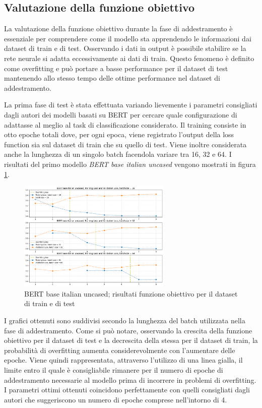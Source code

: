 \subsection{Valutazione della funzione obiettivo}
    La valutazione della funzione obiettivo durante la fase di addestramento è essenziale per comprendere come il modello sta apprendendo le informazioni dai dataset di train e di test. Osservando i dati in output è possibile stabilire se la rete neurale si adatta eccessivamente ai dati di train. Questo fenomeno è definito come overfitting e può portare a basse performance per il dataset di test mantenendo allo stesso tempo delle ottime performance nel dataset di addestramento.
    
    La prima fase di test è stata effettuata variando lievemente i parametri consigliati dagli autori dei modelli basati su BERT per cercare quale configurazione di adattasse al meglio al task di classificazione considerato. Il training consiste in otto epoche totali dove, per ogni epoca, viene registrato l'output della loss function sia sul dataset di train che su quello di test. Viene inoltre considerata anche la lunghezza di un singolo batch facendola variare tra 16, 32 e 64. I risultati del primo modello \textit{BERT base italian uncased} vengono mostrati in figura \ref{fig:losses-uncased}.
    
    \begin{figure}[h]
        \centering
        \includegraphics[width=0.65\textwidth]{pics/bert base italian uncased/losses.png}
        \caption{BERT base italian uncased; risultati funzione obiettivo per il dataset di train e di test}
        \label{fig:losses-uncased}
    \end{figure}
    
    
    I grafici ottenuti sono suddivisi secondo la lunghezza del batch utilizzata nella fase di addestramento. Come si può notare, osservando la crescita della funzione obiettivo per il dataset di test e la decrescita della stessa per il dataset di train, la probabilità di overfitting aumenta considerevolmente con l'aumentare delle epoche. Viene quindi rappresentata, attraverso l'utilizzo di una linea gialla, il limite entro il quale è consigliabile rimanere per il numero di epoche di addestramento necessarie al modello prima di incorrere in problemi di overfitting. I parametri ottimi ottenuti coincidono perfettamente con quelli consigliati dagli autori che suggeriscono un numero di epoche comprese nell'intorno di 4.
    
